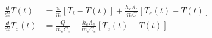 \begin{equation}
  \begin{aligned}
    \frac{d}{dt}T(t)   & = \frac{w}{m} [T_i - T(t)] + \frac{h_e A_e}{m C} [T_e(t) - T(t)]
    \\
    \frac{d}{dt}T_e(t) & = \frac{Q}{m_e C_e} - \frac{h_e A_e}{m_e C_e} [T_e(t) - T(t)]
  \end{aligned}
  \label{eq:elec_heat_tank01_3}
\end{equation}